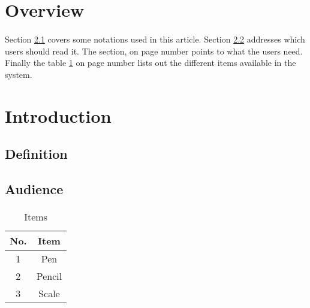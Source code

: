 \documentclass{article}
\begin{document}
	\section{Overview}
	\paragraph{}
	
	Section \ref{subsec:def} covers some notations used in this article. Section \ref{subsec:who} addresses which users should read it. The section,  on page number \pageref{subsec:reqs} points to what the users need. Finally the table \ref{tbl:items} on page number \pageref{tbl:items} lists out the different items available in the system.
	
	\section{Introduction}
	\label{sec:intro}
	\paragraph{}
	
	\lipsum[1-2]
	
	\subsection{Definition}
	\label{subsec:def}
	\paragraph{}
	
	\lipsum[1-2]
	
	\subsection{Audience}
	\label{subsec:who}
	\paragraph{}
	
	\lipsum[1-2]
	
	\begin{table}[h]
		\centering
		\begin{tabular}{cc}
			\hline
			No. & Item\\
			\hline
			1 & Pen\\
			\hline
			2 & Pencil\\
			\hline
			3 & Scale\\
			\hline
		\end{tabular}
	
	\caption{Items}
	\label{tbl:items}
	\end{table}
\end{document}
